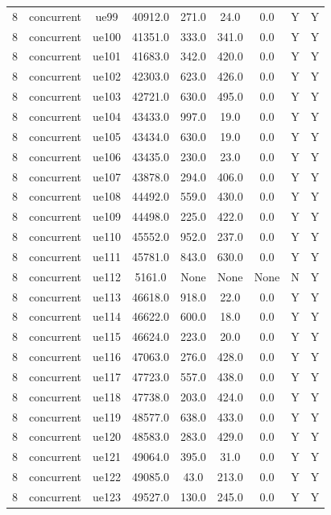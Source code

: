 \begin{table}[ht]
\begin{tabular}{|c|c|c|c|c|c|c|c|c|}
8 & concurrent & ue99 & 40912.0 & 271.0 & 24.0 & 0.0 & Y & Y \\
8 & concurrent & ue100 & 41351.0 & 333.0 & 341.0 & 0.0 & Y & Y \\
8 & concurrent & ue101 & 41683.0 & 342.0 & 420.0 & 0.0 & Y & Y \\
8 & concurrent & ue102 & 42303.0 & 623.0 & 426.0 & 0.0 & Y & Y \\
8 & concurrent & ue103 & 42721.0 & 630.0 & 495.0 & 0.0 & Y & Y \\
8 & concurrent & ue104 & 43433.0 & 997.0 & 19.0 & 0.0 & Y & Y \\
8 & concurrent & ue105 & 43434.0 & 630.0 & 19.0 & 0.0 & Y & Y \\
8 & concurrent & ue106 & 43435.0 & 230.0 & 23.0 & 0.0 & Y & Y \\
8 & concurrent & ue107 & 43878.0 & 294.0 & 406.0 & 0.0 & Y & Y \\
8 & concurrent & ue108 & 44492.0 & 559.0 & 430.0 & 0.0 & Y & Y \\
8 & concurrent & ue109 & 44498.0 & 225.0 & 422.0 & 0.0 & Y & Y \\
8 & concurrent & ue110 & 45552.0 & 952.0 & 237.0 & 0.0 & Y & Y \\
8 & concurrent & ue111 & 45781.0 & 843.0 & 630.0 & 0.0 & Y & Y \\
8 & concurrent & ue112 & 5161.0 & None & None & None & N & Y \\
8 & concurrent & ue113 & 46618.0 & 918.0 & 22.0 & 0.0 & Y & Y \\
8 & concurrent & ue114 & 46622.0 & 600.0 & 18.0 & 0.0 & Y & Y \\
8 & concurrent & ue115 & 46624.0 & 223.0 & 20.0 & 0.0 & Y & Y \\
8 & concurrent & ue116 & 47063.0 & 276.0 & 428.0 & 0.0 & Y & Y \\
8 & concurrent & ue117 & 47723.0 & 557.0 & 438.0 & 0.0 & Y & Y \\
8 & concurrent & ue118 & 47738.0 & 203.0 & 424.0 & 0.0 & Y & Y \\
8 & concurrent & ue119 & 48577.0 & 638.0 & 433.0 & 0.0 & Y & Y \\
8 & concurrent & ue120 & 48583.0 & 283.0 & 429.0 & 0.0 & Y & Y \\
8 & concurrent & ue121 & 49064.0 & 395.0 & 31.0 & 0.0 & Y & Y \\
8 & concurrent & ue122 & 49085.0 & 43.0 & 213.0 & 0.0 & Y & Y \\
8 & concurrent & ue123 & 49527.0 & 130.0 & 245.0 & 0.0 & Y & Y \\

\end{tabular}
\end{table}
